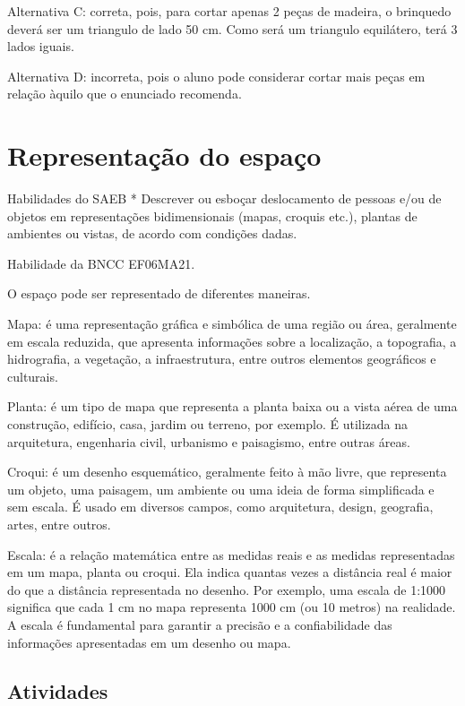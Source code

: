 Alternativa C: correta, pois, para cortar apenas 2 peças de madeira, o
brinquedo deverá ser um triangulo de lado 50 cm. Como será um triangulo
equilátero, terá 3 lados iguais.

Alternativa D: incorreta, pois o aluno pode considerar cortar mais peças
em relação àquilo que o enunciado recomenda.

\chapter{Representação do espaço}

Habilidades do SAEB * Descrever ou esboçar deslocamento de pessoas e/ou
de objetos em representações bidimensionais (mapas, croquis etc.),
plantas de ambientes ou vistas, de acordo com condições dadas.

Habilidade da BNCC EF06MA21.

O espaço pode ser representado de diferentes maneiras.

Mapa: é uma representação gráfica e simbólica de uma região ou área,
geralmente em escala reduzida, que apresenta informações sobre a
localização, a topografia, a hidrografia, a vegetação, a infraestrutura,
entre outros elementos geográficos e culturais.

Planta: é um tipo de mapa que representa a planta baixa ou a vista aérea
de uma construção, edifício, casa, jardim ou terreno, por exemplo. É
utilizada na arquitetura, engenharia civil, urbanismo e paisagismo,
entre outras áreas.

Croqui: é um desenho esquemático, geralmente feito à mão livre, que
representa um objeto, uma paisagem, um ambiente ou uma ideia de forma
simplificada e sem escala. É usado em diversos campos, como arquitetura,
design, geografia, artes, entre outros.

Escala: é a relação matemática entre as medidas reais e as medidas
representadas em um mapa, planta ou croqui. Ela indica quantas vezes a
distância real é maior do que a distância representada no desenho. Por
exemplo, uma escala de 1:1000 significa que cada 1 cm no mapa representa
1000 cm (ou 10 metros) na realidade. A escala é fundamental para
garantir a precisão e a confiabilidade das informações apresentadas em
um desenho ou mapa.

\section{Atividades}

